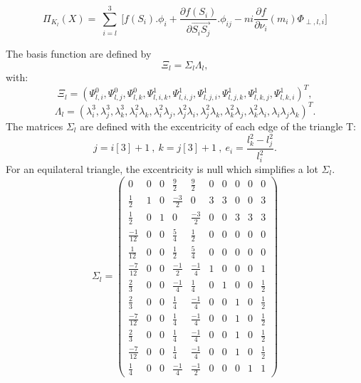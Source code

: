 \documentclass[proc]{edpsmath}
\begin{document}
\begin{equation*}
\Pi_{K_l} (X) = \sum \limits_{\substack{i=l }}^{3}{ [f(S_i).\phi_i +  \frac{\partial f(S_i)}{\partial  \overrightarrow{ S_i S_j } }.\phi_{ij} }   - ni \frac{\partial f}{\partial \nu_i}(m_i) \Phi_{\perp,l,i}]
\end{equation*} 

The basis function are defined by 
\begin{equation*}
\Xi_l =  \Sigma_l \Lambda_l,
\end{equation*} 
 \noindent with:
\begin{equation*}
  \Xi_l=(\Psi_{l,i}^0, \Psi_{l,j}^0, \Psi_{l,k}^0, \Psi_{l,i,k}^1,\Psi_{l,i,j}^1,\Psi_{l,j,i}^1,\Psi_{l,j,k}^1 ,\Psi_{l,k,j}^1,\Psi_{l,k,i}^1)^T,
\end{equation*} 
\begin{equation*}
  \Lambda_l = ( \lambda_i^3,\lambda_j^3,\lambda_k^3,\lambda_i^2\lambda_k,\lambda_i^2\lambda_j,\lambda_j^2\lambda_i,\lambda_j^2\lambda_k,\lambda_k^2\lambda_j,\lambda_k^2\lambda_i,\lambda_i\lambda_j\lambda_k)^T.
\end{equation*}  
  \noindent The matrices $\Sigma_l$ are defined with the excentricity of each edge of the triangle T: 
\begin{equation*}
j=i[3]+1 ~,~ k=j[3]+1~,~ e_i = \frac{l_k^2 - l_j^2}{l_i^2}.
\end{equation*} 
For an equilateral triangle, the excentricity is null which simplifies a lot $\Sigma_l$.
\begin{equation*}
\Sigma_l = 
\begin{pmatrix}
	0 & 0 & 0 & \frac{9}{2} & \frac{9}{2} & 0 & 0 & 0 & 0 & 0  \\
	\frac{1}{2} & 1 & 0 & \frac{-3}{2} & 0 & 3 & 3 & 0 & 0 & 3 \\
	\frac{1}{2} & 0 & 1 & 0 & \frac{-3}{2} & 0 & 0 & 3 & 3 & 3 \\	 
	\frac{-1}{12} & 0 & 0 & \frac{ 5}{4} & \frac{ 1}{2} & 0 & 0 & 0 & 0 & 0 \\	 
	\frac{ 1}{12} & 0 & 0 & \frac{ 1}{2} & \frac{ 5}{4} & 0 & 0 & 0 & 0 & 0 \\
	\frac{-7}{12} & 0 & 0 & \frac{-1}{2} & \frac{-1}{4} & 1 & 0 & 0 & 0 & 1 \\
    \frac{ 2}{3}& 0 & 0 & \frac{-1}{4} & \frac{ 1}{4} & 0 & 1 & 0 & 0 & \frac{1}{2} \\
	\frac{ 2}{3}& 0 & 0 & \frac{ 1}{4} & \frac{-1}{4} & 0 & 0 & 1 & 0 & \frac{1}{2} \\
    \frac{-7}{12} & 0 & 0 & \frac{ 1}{4} & \frac{-1}{4} & 0 & 0 & 1 & 0 & \frac{1}{2} \\
	\frac{ 2}{3}& 0 & 0 & \frac{ 1}{4} & \frac{-1}{4} & 0 & 0 & 1 & 0 & \frac{1}{2} \\
    \frac{-7}{12} & 0 & 0 & \frac{ 1}{4} & \frac{-1}{4} & 0 & 0 & 1 & 0 & \frac{1}{2} \\
	\frac{1}{4} & 0 & 0 & \frac{-1}{4} & \frac{-1}{2} & 0 & 0 & 0 & 1 & 1 
\end{pmatrix}
\end{equation*}
\end{document}
